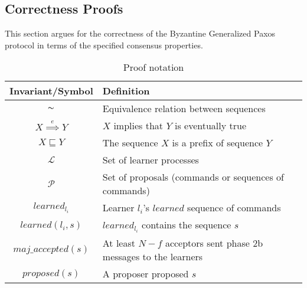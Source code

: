 \subsection{Correctness Proofs}

This section argues for the correctness of the Byzantine Generalized Paxos protocol in terms of the specified consensus properties.\par


\begin{table}[h!]
	\renewcommand{\arraystretch}{1.5}
	\centering
	\begin{tabularx}{\linewidth}{ |c|X|}
		\hline
		Invariant/Symbol & Definition \\
		\hline
		$\thicksim$ & Equivalence relation between sequences \\
		\hline
		$X \overset{e}{\implies} Y$ & $X$ implies that $Y$ is eventually true \\
		\hline
		$X \sqsubseteq Y$ & The sequence $X$ is a prefix of sequence $Y$ \\
		\hline
		$\mathcal{L}$ & Set of learner processes \\
		\hline
		$\mathcal{P}$ & Set of proposals (commands or sequences of commands) \\
		\hline
		$learned_{l_i}$ & Learner $l_i$'s $learned$ sequence of commands \\
		\hline
		$learned(l_i,s)$ & $learned_{l_i}$ contains the sequence $s$ \\
		\hline
		$maj\_accepted(s)$ & At least $N-f$ acceptors sent phase 2b messages to the learners\\
		\hline
		$proposed(s)$ & A proposer proposed $s$ \\
		\hline
		
  	\end{tabularx} 
	\caption{Proof notation} 
	\label{table:1}
\end{table}

